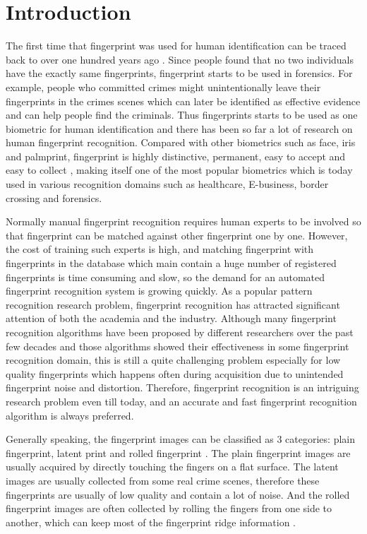 \section{Introduction}
The first time that fingerprint was used for human identification can be traced back to over one hundred years ago \cite{Maltoni2009}. Since people found that no two individuals have the exactly same fingerprints, fingerprint starts to be used in forensics. For example, people who committed crimes might unintentionally leave their fingerprints in the crimes scenes which can later be identified as effective evidence and can help people find the criminals. Thus fingerprints starts to be used as one biometric for human identification and there has been so far a lot of research on human fingerprint recognition. Compared with other biometrics such as face, iris and palmprint, fingerprint is highly distinctive, permanent, easy to accept and easy to collect \cite{Maltoni2009}, making itself one of the most popular biometrics which is today used in various recognition domains such as healthcare, E-business, border crossing and forensics.

Normally manual fingerprint recognition requires human experts to be involved so that fingerprint can be matched against other fingerprint one by one. However, the cost of training such experts is high, and matching fingerprint with fingerprints in the database which main contain a huge number of registered fingerprints is time consuming and slow, so the demand for an automated fingerprint recognition system is growing quickly. As a popular pattern recognition research problem, fingerprint recognition has attracted significant attention of both the academia and the industry. Although many fingerprint recognition algorithms have been proposed by different researchers over the past few decades and those algorithms showed their effectiveness in some fingerprint recognition domain, this is still a quite challenging problem especially for low quality fingerprints which happens often during acquisition due to unintended fingerprint noise and distortion. Therefore, fingerprint recognition is an intriguing research problem even till today, and an accurate and fast fingerprint recognition algorithm is always preferred.

Generally speaking, the fingerprint images can be classified as 3 categories: plain fingerprint, latent print and rolled fingerprint \cite{nimkarFingerprintSegmentationAlgorithms2014}.
The plain fingerprint images are usually acquired by directly touching the fingers on a flat surface.
The latent images are usually collected from some real crime scenes, therefore these fingerprints are usually of low quality and contain a lot of noise.
And the rolled fingerprint images are often collected by rolling the fingers from one side to another, which can keep most of the fingerprint ridge information \cite{nimkarFingerprintSegmentationAlgorithms2014}.


